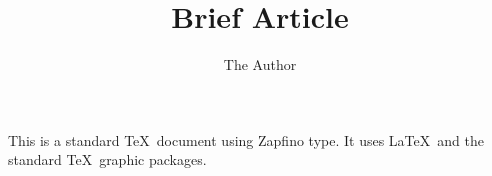 \documentclass[12pt]{article} \usepackage{geometry} \geometry{letterpaper} \usepackage{graphicx} \usepackage{amssymb}
\title{Brief Article} \author{The Author}
\begin{document}
 \maketitle
This is a standard \TeX\ document using Zapfino type. It uses \LaTeX\ and the standard \TeX\ graphic packages.
\end{document}
